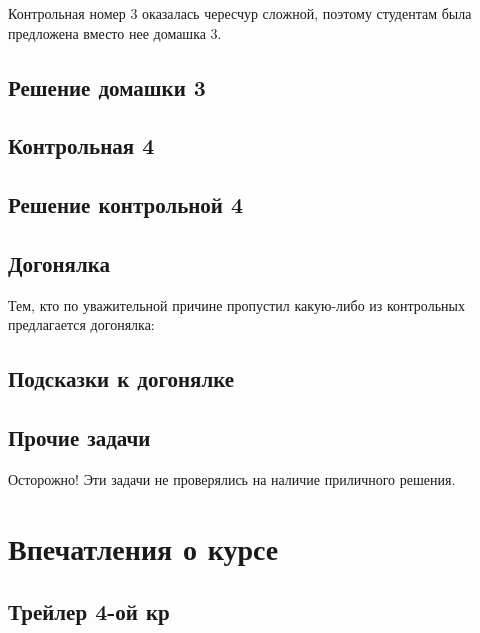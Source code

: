 \documentclass[11pt, openany]{book}
\numberwithin{equation}{page} %
\theoremstyle{definition} %
\theoremstyle{definition}
\theoremstyle{definition}
\begin{document}
Контрольная номер 3 оказалась чересчур сложной, поэтому студентам была предложена вместо нее домашка 3.




\section{Решение домашки 3}






\section{Контрольная 4}



\section{Решение контрольной 4}




\section{Догонялка}

Тем, кто по уважительной причине пропустил какую-либо из контрольных предлагается догонялка:



\section{Подсказки к догонялке}



\section{Прочие задачи}

Осторожно! Эти задачи не проверялись на наличие приличного решения.




\chapter{Впечатления о курсе}



\section{Трейлер 4-ой кр}
\end{document}
